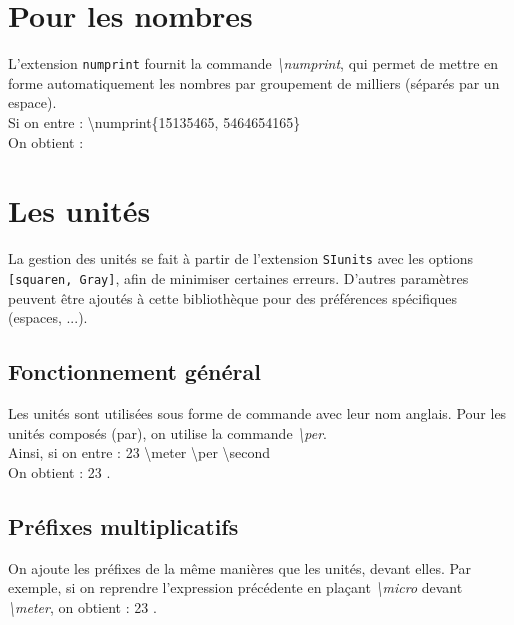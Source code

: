 \documentclass[a4paper, 10pt]{book}
\begin{document}
\section{Pour les nombres}
\vspace{0.5 cm}

L'extension \texttt{numprint} fournit la commande \textit{\textbackslash numprint}, qui permet de mettre en forme automatiquement les nombres par groupement de milliers (séparés par un espace). \\

Si on entre : \textsf{\textbackslash numprint\{15135465, 5464654165\}} \\
On obtient : 

\vspace{0.8cm}
\section{Les unités}
\vspace{0.5 cm}

La gestion des unités se fait à partir de l'extension \texttt{SIunits} avec les options \texttt{[squaren, Gray]}, afin de minimiser certaines erreurs. D'autres paramètres peuvent être ajoutés à cette bibliothèque pour des préférences spécifiques (espaces, ...).

\pagebreak
\subsection{Fonctionnement général}
\vspace{0.5 cm}

Les unités sont utilisées sous forme de commande avec leur nom anglais. Pour les unités composés (par), on utilise la commande \textit{\textbackslash per}.\\

Ainsi, si on entre : \textsf{23 \textbackslash meter \textbackslash per \textbackslash second} \\
On obtient : 23 \meter \per \second. \\

\subsection{Préfixes multiplicatifs}
\vspace{0.5 cm}

On ajoute les préfixes de la même manières que les unités, devant elles. Par exemple, si on reprendre l'expression précédente en plaçant \textit{\textbackslash micro} devant \textit{\textbackslash meter}, on obtient : 23 \micro \meter \per \second. \\
\end{document}
